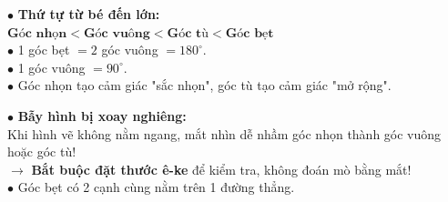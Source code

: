 \documentclass[14pt,a4paper,oneside]{extbook}
\begin{document}
\vspace{2.5mm}

\noindent
\begin{minipage}[t]{0.54\textwidth}
  \begin{tcolorbox}[
    enhanced,
    title={\footnotesize\bfseries\color{white}\faSortNumericAsc\ Mẹo so sánh độ lớn 4 loại góc},
    colback=green!3!white,
    colframe=green!60!black,
    arc=2.5mm, boxrule=0.8pt, top=1.8mm, bottom=1.8mm, left=2.2mm, right=2.2mm
  ]
    \footnotesize
    $\bullet$ \textbf{Thứ tự từ bé đến lớn:}\\
    $\textbf{Góc nhọn} < \textbf{Góc vuông} < \textbf{Góc tù} < \textbf{Góc bẹt}$\\
    $\bullet$ 1 góc bẹt $= 2$ góc vuông $= 180^\circ$.\\
    $\bullet$ 1 góc vuông $= 90^\circ$.\\
    $\bullet$ Góc nhọn tạo cảm giác "sắc nhọn", góc tù tạo cảm giác "mở rộng".
  \end{tcolorbox}
\end{minipage}%
\hfill
\begin{minipage}[t]{0.44\textwidth}
  \begin{tcolorbox}[
    enhanced,
    title={\footnotesize\bfseries\color{white}\faExclamationTriangle\ Mẹo tránh bẫy trắc nghiệm},
    colback=red!2!white,
    colframe=red!70!black,
    arc=2.5mm, boxrule=0.8pt, top=1.8mm, bottom=1.8mm, left=2.2mm, right=2.2mm
  ]
    \footnotesize
    $\bullet$ \textbf{Bẫy hình bị xoay nghiêng:}\\
    Khi hình vẽ không nằm ngang, mắt nhìn dễ nhầm góc nhọn thành góc vuông hoặc góc tù!\\
    $\rightarrow$ \textbf{Bắt buộc đặt thước ê-ke} để kiểm tra, không đoán mò bằng mắt!\\
    $\bullet$ Góc bẹt có 2 cạnh cùng nằm trên 1 đường thẳng.
  \end{tcolorbox}
\end{minipage}
\end{document}

